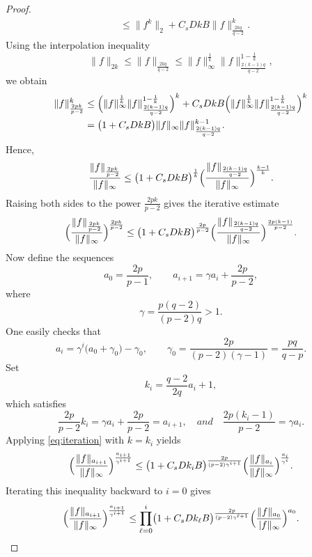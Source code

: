 \documentclass[12pt, twoside]{article}
\theoremstyle{definition}
\numberwithin{equation}{section}
\begin{document}
\begin{proof}
{\begin{align*}
		&\le \|f^k\|_2 + C_s D k B \|f\|_{\frac{2kq}{q-2}}^k .
		\end{align*}
		Using the interpolation inequality
		\[
	\|f\|_{2k}\le	\|f\|_{\frac{2kq}{q-2}} \le \|f\|_\infty^{\frac{1}{k}} \|f\|_{\frac{2(k-1)q}{q-2}}^{1-\frac{1}{k}},
		\]
		we obtain
		\begin{align*}
		\|f\|_{\frac{2pk}{p-2}}^k 
		&\le \Bigl(\|f\|_\infty^{\frac{1}{k}} \|f\|_{\frac{2(k-1)q}{q-2}}^{1-\frac{1}{k}}\Bigr)^k
		+ C_s D k B \Bigl(\|f\|_\infty^{\frac{1}{k}} \|f\|_{\frac{2(k-1)q}{q-2}}^{1-\frac{1}{k}}\Bigr)^k \\
		&= \bigl(1 + C_s D k B\bigr)
		\|f\|_\infty \|f\|_{\frac{2(k-1)q}{q-2}}^{k-1}.
		\end{align*}    
		Hence,
		\[
		\frac{\|f\|_{\frac{2pk}{p-2}}}{\|f\|_\infty}
		\le \bigl(1 + C_s D k B\bigr)^{\frac{1}{k}}
		\Bigl(\frac{\|f\|_{\frac{2(k-1)q}{q-2}}}{\|f\|_\infty}\Bigr)^{\frac{k-1}{k}} .
		\]    
		Raising both sides to the power \(\frac{2pk}{p-2}\) gives the iterative estimate
		\begin{equation}\label{eq:iteration}
		\Bigl(\frac{\|f\|_{\frac{2pk}{p-2}}}{\|f\|_\infty}\Bigr)^{\frac{2pk}{p-2}}
		\le \bigl(1 + C_s D k B\bigr)^{\frac{2p}{p-2}}
		\Bigl(\frac{\|f\|_{\frac{2(k-1)q}{q-2}}}{\|f\|_\infty}\Bigr)^{\frac{2p(k-1)}{p-2}} .
		\end{equation}    
		Now define the sequences
		\[
		a_0 = \frac{2p}{p-1}, \qquad
		a_{i+1} = \gamma a_i + \frac{2p}{p-2},
		\]
		where 
		\begin{equation*}
			\gamma = \frac{p(q-2)}{(p-2)q} > 1.
		\end{equation*}
		One easily checks that
		\[
		a_i = \gamma^i\bigl(a_0 + \gamma_0\bigr) - \gamma_0, \qquad
		\gamma_0 = \frac{2p}{(p-2)(\gamma-1)} =\frac{pq}{q-p}.
		\]
		Set
		\[
		k_i = \frac{q-2}{2q}a_i + 1,
		\]
		which satisfies
		\[
		\frac{2p}{p-2}k_i = \gamma a_i + \frac{2p}{p-2} = a_{i+1},\quad and\quad \frac{2p(k_{i}-1)}{p-2}=\gamma a_{i}.
		\]
		Applying \eqref{eq:iteration} with \(k = k_i\) yields
		\[
		\Bigl(\frac{\|f\|_{a_{i+1}}}{\|f\|_\infty}\Bigr)^{\frac{a_{i+1}}{\gamma^{i+1}}}
		\le \bigl(1 + C_s D k_i B\bigr)^{\frac{2p}{(p-2)\gamma^{i+1}}}
		\Bigl(\frac{\|f\|_{a_i}}{\|f\|_\infty}\Bigr)^{\frac{a_i}{\gamma^i}} .
		\]
		Iterating this inequality backward to \(i=0\) gives
		\[
		\Bigl(\frac{\|f\|_{a_{i+1}}}{\|f\|_\infty}\Bigr)^{\frac{a_{i+1}}{\gamma^{i+1}}}
		\le \prod_{\ell=0}^{i} \bigl(1 + C_s D k_\ell B\bigr)^{\frac{2p}{(p-2)\gamma^{\ell+1}}}
		\Bigl(\frac{\|f\|_{a_0}}{\\|f\|_\infty}\Bigr)^{a_0}.
\]}
\end{proof}
\end{document}
